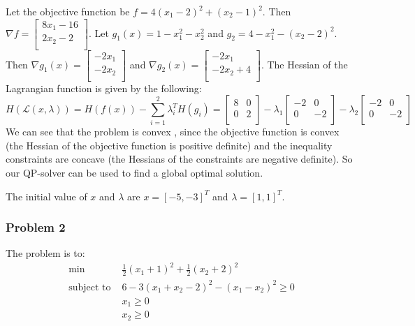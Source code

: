 \documentclass{article}
\begin{document}
Let the objective function be $f =  4(x_1-2)^2 + (x_2-1)^2 $. Then $\nabla f = \begin{bmatrix} 8x_1-16\\ 2x_2-2 \\ \end{bmatrix}$. Let $g_1(x) = 1 - x_1^2 - x_2^2 $ and $g_2 = 4 - x_1^2 - (x_2-2)^2$. Then $\nabla g_1(x) = \begin{bmatrix} -2x_1\\ -2x_2 \\ \end{bmatrix}$ and $\nabla g_2(x) = \begin{bmatrix} -2x_1 \\ -2x_2+4 \\ \end{bmatrix}$. The Hessian of the Lagrangian function is given by the following: 
\begin{equation*}
    H(\mathcal{L}(x, \lambda)) = H(f(x)) - \sum_{i=1}^2 \lambda_i^T H(g_i) = \begin{bmatrix} 8 &  0\\ 0 & 2 \\ \end{bmatrix} - \lambda_1 \begin{bmatrix} -2 & 0\\ 0 & -2 \\ \end{bmatrix} - \lambda_2 \begin{bmatrix} -2 & 0\\ 0 & -2 \\ \end{bmatrix}
\end{equation*}
We can see that the problem is convex , since the objective function is convex (the Hessian of the objective function is positive definite) and the inequality constraints are concave (the Hessians of the constraints are negative definite). So our QP-solver can be used to find a global optimal solution.

The initial value of $x$ and $\lambda$ are $x = [-5, -3]^T$ and $\lambda = [1, 1]^T$. 


\subsubsection{Problem 2}
The problem is to:
\begin{equation*}
\begin{aligned}
\textrm{min } & \frac{1}{2}(x_1+1)^2+\frac{1}{2}(x_2+2)^2 \\
\textrm{subject to } & 6 - 3(x_1+x_2-2)^2 - (x_1-x_2)^2 \ge 0 \\
                     & x_1 \geq 0 \\
                     & x_2 \geq 0 \\ 
\end{aligned}
\end{equation*}
\end{document}
